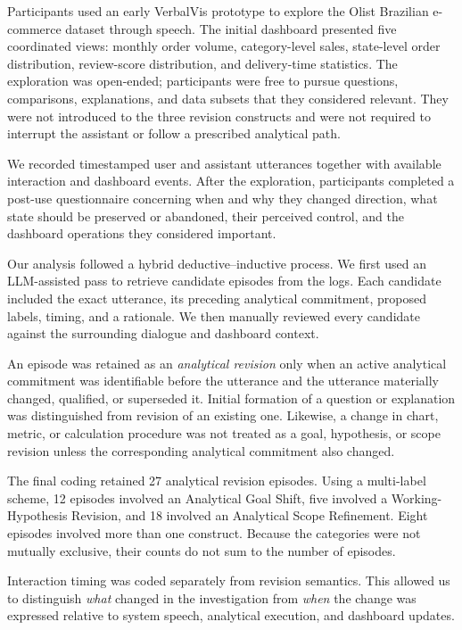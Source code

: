 \documentclass[journal]{IEEEtran}
\begin{document}
Participants used an early VerbalVis prototype to explore the Olist Brazilian
e-commerce dataset through speech. The initial dashboard presented five
coordinated views: monthly order volume, category-level sales, state-level
order distribution, review-score distribution, and delivery-time statistics.
The exploration was open-ended; participants were free to pursue questions,
comparisons, explanations, and data subsets that they considered relevant.
They were not introduced to the three revision constructs and were not
required to interrupt the assistant or follow a prescribed analytical path.

We recorded timestamped user and assistant utterances together with available
interaction and dashboard events. After the exploration, participants
completed a post-use questionnaire concerning when and why they changed
direction, what state should be preserved or abandoned, their perceived
control, and the dashboard operations they considered important.

Our analysis followed a hybrid deductive--inductive process. We first used an
LLM-assisted pass to retrieve candidate episodes from the logs. Each candidate
included the exact utterance, its preceding analytical commitment, proposed
labels, timing, and a rationale. We then manually reviewed every candidate
against the surrounding dialogue and dashboard context.

An episode was retained as an \emph{analytical revision} only when an active
analytical commitment was identifiable before the utterance and the utterance
materially changed, qualified, or superseded it. Initial formation of a
question or explanation was distinguished from revision of an existing one.
Likewise, a change in chart, metric, or calculation procedure was not treated
as a goal, hypothesis, or scope revision unless the corresponding analytical
commitment also changed.

The final coding retained 27 analytical revision episodes. Using a multi-label
scheme, 12 episodes involved an Analytical Goal Shift, five involved a
Working-Hypothesis Revision, and 18 involved an Analytical Scope Refinement.
Eight episodes involved more than one construct. Because the categories were
not mutually exclusive, their counts do not sum to the number of episodes.

Interaction timing was coded separately from revision semantics. This allowed
us to distinguish \emph{what} changed in the investigation from \emph{when}
the change was expressed relative to system speech, analytical execution, and
dashboard updates.
\end{document}
